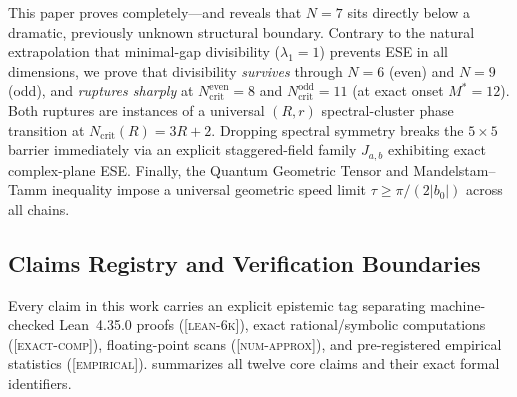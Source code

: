\documentclass[11pt,reqno]{amsart}
\theoremstyle{definition}
\newcommand{\taglean}{\textsc{[lean-6k]}}
\newcommand{\tagexact}{\textsc{[exact-comp]}}
\newcommand{\tagnum}{\textsc{[num-approx]}}
\newcommand{\tagemp}{\textsc{[empirical]}}
\begin{document}
This paper proves  completely---and reveals that $N=7$ sits directly below a dramatic, previously unknown structural boundary. Contrary to the natural extrapolation that minimal-gap divisibility ($\lambda_1=1$) prevents ESE in all dimensions, we prove that divisibility \emph{survives} through $N=6$ (even) and $N=9$ (odd), and \emph{ruptures sharply} at $N_{\mathrm{crit}}^{\mathrm{even}}=8$ and $N_{\mathrm{crit}}^{\mathrm{odd}}=11$ (at exact onset $M^*=12$). Both ruptures are instances of a universal $(R,r)$ spectral-cluster phase transition at $N_{\mathrm{crit}}(R)=3R+2$. Dropping spectral symmetry breaks the $5\times 5$ barrier immediately via an explicit staggered-field family $J_{a,b}$ exhibiting exact complex-plane ESE. Finally, the Quantum Geometric Tensor and Mandelstam--Tamm inequality impose a universal geometric speed limit $\tau\ge\pi/(2|b_0|)$ across all chains.

\subsection{Claims Registry and Verification Boundaries}
\label{sec:claims}

Every claim in this work carries an explicit epistemic tag separating machine-checked Lean~4.35.0 proofs (\taglean{}), exact rational/symbolic computations (\tagexact{}), floating-point scans (\tagnum{}), and pre-registered empirical statistics (\tagemp{}).  summarizes all twelve core claims and their exact formal identifiers.
\end{document}
